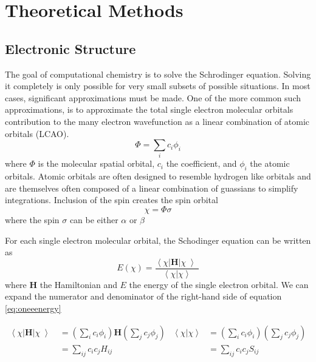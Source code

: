 \chapter{Theoretical Methods} \label{theoreticalMethods}

\section{Electronic Structure}\label{secular}

The goal of computational chemistry is to solve the Schrodinger equation.
Solving it completely is only possible for very small subsets of possible situations.
In most cases, significant approximations must be made.
One of the more common such approximations, is to approximate the total single electron molecular orbitals contribution to the many electron wavefunction as a linear combination of atomic orbitals (LCAO).
\begin{equation}
  \Phi=\sum_{i}c_i\phi_i
\end{equation}
where \(\Phi\) is the molecular spatial orbital, \(c_i\) the coefficient, and \(\phi_i\) the atomic orbitals.
Atomic orbitals are often designed to resemble hydrogen like orbitals and are themselves often composed of a linear combination of guassians to simplify integrations.
Inclusion of the spin creates the spin orbital
\begin{equation}
  \chi = \Phi \sigma
\end{equation}
where the spin \(\sigma\) can be either \(\alpha\) or \(\beta\)

For each single electron molecular orbital, the Schodinger equation can be written as
\begin{equation} \label{eq:oneeenergy}
  E(\chi) = \frac{\left<\right.\chi\left|\right.\bm{H}\left.\right|\chi\left>\right.}{\left<\right.\chi\left.\right|\left.\chi\left.\right.\right>}
\end{equation}
where $\mathbf{H}$ the Hamiltonian and $E$ the energy of the single electron orbital.
We can expand the numerator and denominator of the right-hand side of equation \ref{eq:oneeenergy}

\begin{align}
  \label{eq:variation1}
  \left<\right.\chi\left|\right.\bm{H}\left.\right|\chi\left>\right.&=
  \left( \sum_{i} c_i \phi_i \right) \mathbf{H} \left( \sum_j c_j \phi_j \right) &
  \left<\right.\chi\left.\right|\left.\chi\left.\right.\right>&=
  \left( \sum_{i} c_i \phi_i \right) \left( \sum_j c_j \phi_j \right)  \\
  &= \sum_{ij} c_{i}c_j H_{ij} & &= \sum_{ij} c_{i}c_j S_{ij} 
  \label{eq:variation2}
\end{align}

